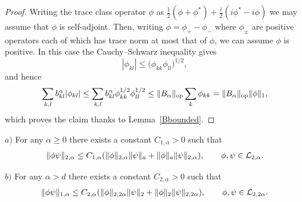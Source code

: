 \begin{proof}
Writing the trace class operator $\phi$ as $\frac
12(\phi+\phi^*)+\frac i2(i\phi^*-i\phi)$ we may assume that $\phi$ is
self-adjoint. Then, writing $\phi= \phi_+-\phi_-$ where $\phi_\pm$ are positive
operators each of which has trace norm at most that of $\phi$, we can
assume $\phi$ is positive. In this case the Cauchy--Schwarz inequality
gives
\[
|\phi_{kl}|  \leq \big(\phi_{kk} \phi_{ll}\big)^{1/2},
\]
and hence
\begin{gather*}
\sum_{k,l}b_{kl}^{\alpha} |\phi_{kl}|\leq
\sum_{k,l}b_{kl}^{\alpha} \phi_{kk}^{1/2} \phi_{ll}^{1/2}
\leq \Vert B_{\alpha}\Vert_{\rm op} \sum_k\phi_{kk}
=\Vert B_{\alpha}\Vert_{\rm op} \Vert\phi\Vert_1 ,
\end{gather*}
which proves the claim thanks to Lemma~\ref{Bbounded}.
\end{proof}

\begin{lemma}\label{product}
$a)$  For any $\alpha\geq 0$ there exists a constant $C_{1,\alpha}>0$
such that
\begin{gather}\label{prodest1}
\Vert\phi \psi\Vert_{2,\alpha}\leq C_{1,\alpha}(\Vert\phi\Vert_{2,\alpha} \Vert\psi\Vert_a
+\Vert\phi\Vert_a \Vert\psi\Vert_{2,\alpha}),\qquad \phi, \psi\in {\cal L}_{2,\alpha} .
\end{gather}

$b)$  For any $\alpha> d$ there exists a constant $C_{2,\alpha}>0$
such that
\begin{gather}\label{prodest2}
\Vert\phi \psi\Vert_{1,\alpha}\leq C_{2,\alpha}(\Vert\phi\Vert_{2,2\alpha} \Vert\psi\Vert_2
+\Vert\phi\Vert_2 \Vert\psi\Vert_{2,2\alpha}),\qquad \phi,\psi\in {\cal L}_{2, 2\alpha} .
\end{gather}
\end{lemma}

